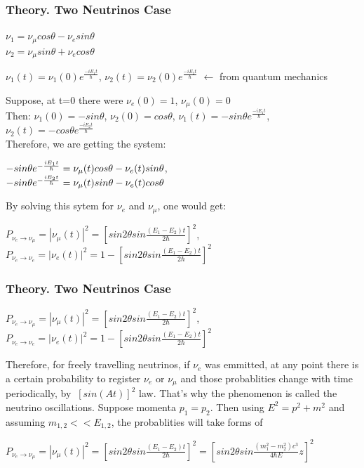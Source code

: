 \begin{frame}\frametitle{Theory. Two Neutrinos Case}
  \scriptsize
  \begin{center}
  $\nu_1=\nu_{\mu}cos\theta-\nu_esin\theta$\\
  $\nu_2=\nu_{\mu}sin\theta+\nu_ecos\theta$\\
  \end{center}
  \begin{center}
  $\nu_1(t)=\nu_1(0)e^{\frac{-iE_1t}{\hbar}}$, $\nu_2(t)=\nu_2(0)e^{\frac{-iE_2t}{\hbar}}$ $\leftarrow$ from quantum mechanics\\
  \end{center}
  Suppose, at t=0 there were $\nu_e(0)=1$, $\nu_\mu(0)=0$\\
  Then: $\nu_1(0)=-sin\theta$, $\nu_2(0)=cos\theta$, $\nu_1(t)=-{sin\theta}e^{\frac{-iE_1t}{\hbar}}$, $\nu_2(t)=-{cos\theta}e^{\frac{-iE_2t}{\hbar}}$\\
  Therefore, we are getting the system:\\
  \begin{center}
  $-{sin\theta}e^{-{{iE_1t} \over \hbar}}=\nu_\mu(t)cos\theta-\nu_e(t)sin\theta$,\\
  $-{sin\theta}e^{-{{iE_2t} \over \hbar}}=\nu_\mu(t)sin\theta-\nu_e(t)cos\theta$\\
  \end{center}
  By solving this sytem for $\nu_e$ and $\nu_\mu$, one would get:\\
  \begin{center}
  $P_{\nu_e \rightarrow \nu_\mu}=|\nu_\mu(t)|^2=[{sin2\theta}sin{\frac{(E_1-E_2)t}{2\hbar}}]^2$,\\
  $P_{\nu_e \rightarrow \nu_e}=|\nu_e(t)|^2=1-[{sin2\theta}sin{\frac{(E_1-E_2)t}{2\hbar}}]^2$\\
  \end{center}
\end{frame}

\begin{frame}\frametitle{Theory. Two Neutrinos Case}
  \begin{center}
  $P_{\nu_e \rightarrow \nu_\mu}=|\nu_\mu(t)|^2=[{sin2\theta}sin{\frac{(E_1-E_2)t}{2\hbar}}]^2$,\\
  $P_{\nu_e \rightarrow \nu_e}=|\nu_e(t)|^2=1-[{sin2\theta}sin{\frac{(E_1-E_2)t}{2\hbar}}]^2$\\
  \end{center}
  Therefore, for freely travelling neutrinos, if $\nu_e$ was emmitted, at any point there is a certain probability to register $\nu_e$ or $\nu_\mu$ and those probablities change with time periodically, by $~[sin(At)]^2$ law. That's why the phenomenon is called the neutrino oscillations.
  Suppose momenta $p_1=p_2$. Then using $E^2=p^2+m^2$ and assuming $m_{1,2}<<E_{1,2}$, the probablities will take forms of\\
  \begin{center}
  $P_{\nu_e \rightarrow \nu_\mu}=|\nu_\mu(t)|^2=[{sin2\theta}sin{\frac{(E_1-E_2)t}{2\hbar}}]^2=[{sin2\theta}sin{\frac{(m_1^2-m_2^2)c^3}{4\hbar{E}}z}]^2$\\  
  \end{center}
\end{frame}

